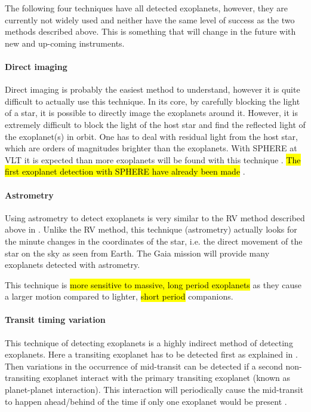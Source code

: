 The following four techniques have all detected exoplanets, however, they are currently not widely
used and neither have the same level of success as the two methods described above. This is
something that will change in the future with new and up-coming instruments.

\paragraph{Direct imaging}

Direct imaging is probably the easiest method to understand, however it is quite difficult to
actually use this technique. In its core, by carefully blocking the light of a star, it is possible
to directly image the exoplanets around it. However, it is extremely difficult to block the light of
the host star and find the reflected light of the exoplanet(s) in orbit. One has to deal with
residual light from the host star, which are orders of magnitudes brighter than the exoplanets. With
SPHERE at VLT it is expected than more exoplanets will be found with this technique
\citep{Beuzit2008}. \hl{The first exoplanet detection with SPHERE have already been made}
\citep[see e.g.]{Vigan2016,Bonnefoy2016,Apai2016,Maire2016,Zurlo2016}.


\paragraph{Astrometry}

Using astrometry to detect exoplanets is very similar to the RV method described above in
. Unlike the RV method, this technique (astrometry) actually looks for the minute
changes in the coordinates of the star, i.e. the direct movement of the star on the sky as seen from
Earth. The Gaia mission \citep{GAIA} will provide many exoplanets detected with astrometry.

This technique is \hl{more sensitive to massive, long period exoplanets} as they cause a larger
motion compared to lighter, \hl{short period} companions.


\paragraph{Transit timing variation}

This technique of detecting exoplanets is a highly indirect method of detecting exoplanets. Here a
transiting exoplanet has to be detected first as explained in . Then
variations in the occurrence of mid-transit can be detected if a second non-transiting exoplanet
interact with the primary transiting exoplanet (known as planet-planet interaction). This
interaction will periodically cause the mid-transit to happen ahead/behind of the time if only one
exoplanet would be present \citep{Agol2005,Holman2005}.

